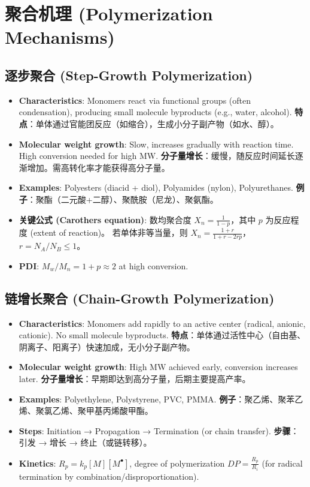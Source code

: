 \documentclass[12pt,a4paper]{ctexart}
\begin{document}
\section{聚合机理 (Polymerization Mechanisms)}

\subsection{逐步聚合 (Step-Growth Polymerization)}
\begin{itemize}
    \item \textbf{Characteristics}: Monomers react via functional groups (often condensation), producing small molecule byproducts (e.g., water, alcohol).  
    \textbf{特点}：单体通过官能团反应（如缩合），生成小分子副产物（如水、醇）。
    \item \textbf{Molecular weight growth}: Slow, increases gradually with reaction time. High conversion needed for high MW.  
    \textbf{分子量增长}：缓慢，随反应时间延长逐渐增加。需高转化率才能获得高分子量。
    \item \textbf{Examples}: Polyesters (diacid + diol), Polyamides (nylon), Polyurethanes.  
    \textbf{例子}：聚酯（二元酸+二醇）、聚酰胺（尼龙）、聚氨酯。
    \item \textbf{关键公式 (Carothers equation)}:  
    数均聚合度 $X_n = \frac{1}{1-p}$，其中 $p$ 为反应程度 (extent of reaction)。  
    若单体非等当量，则 $X_n = \frac{1+r}{1+r-2rp}$，$r = N_A/N_B \le 1$。
    \item \textbf{PDI}: $M_w/M_n = 1+p \approx 2$ at high conversion.
\end{itemize}

\subsection{链增长聚合 (Chain-Growth Polymerization)}
\begin{itemize}
    \item \textbf{Characteristics}: Monomers add rapidly to an active center (radical, anionic, cationic). No small molecule byproducts.  
    \textbf{特点}：单体通过活性中心（自由基、阴离子、阳离子）快速加成，无小分子副产物。
    \item \textbf{Molecular weight growth}: High MW achieved early, conversion increases later.  
    \textbf{分子量增长}：早期即达到高分子量，后期主要提高产率。
    \item \textbf{Examples}: Polyethylene, Polystyrene, PVC, PMMA.  
    \textbf{例子}：聚乙烯、聚苯乙烯、聚氯乙烯、聚甲基丙烯酸甲酯。
    \item \textbf{Steps}: Initiation → Propagation → Termination (or chain transfer).  
    \textbf{步骤}：引发 → 增长 → 终止（或链转移）。
    \item \textbf{Kinetics}: $R_p = k_p [M][M^\bullet]$, degree of polymerization $DP = \frac{R_p}{R_i}$ (for radical termination by combination/disproportionation).
\end{itemize}
\end{document}
